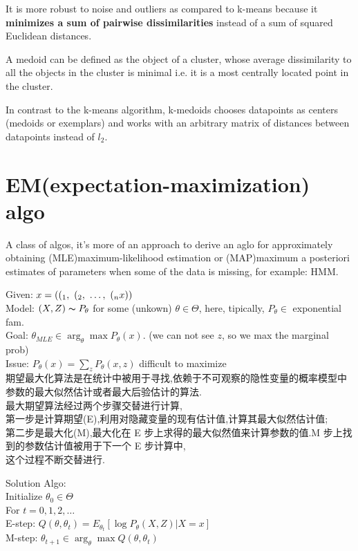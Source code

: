 \documentclass{article}
\begin{document}
It is more robust to noise and outliers as compared to k-means because it \textbf{minimizes a sum of pairwise dissimilarities} 
instead of a sum of squared Euclidean distances.

A medoid can be defined as the object of a cluster, whose average dissimilarity to all the objects in the cluster is minimal i.e. 
it is a most centrally located point in the cluster.

In contrast to the k-means algorithm, k-medoids chooses datapoints as centers (medoids or exemplars) and 
works with an arbitrary matrix of distances between datapoints instead of $l_2$.

\section{EM(expectation-maximization) algo}
A class of algos,
it's more of an approach to derive an aglo for approximately obtaining (MLE)maximum-likelihood estimation or 
(MAP)maximum a posteriori estimates of parameters when some of the data is missing, for example: HMM.

\noindent
Given: $x = ((_1,~(_2,~\ldots,~(_nx))$\\
Model: $(X, Z) \thicksim{P}_\theta$ for some (unkown) $\theta \in \Theta$, here, tipically, $P_\theta \in $ exponential fam.\\
Goal: $\theta_{MLE} \in \arg_\theta \max P_\theta(x)$. (we can not see $z$, so we max the marginal prob)\\
Issue: $P_\theta(x) = \sum_z P_\theta(x,z)$ difficult to maximize\\

期望最大化算法是在统计中被用于寻找,依赖于不可观察的隐性变量的概率模型中参数的最大似然估计或者最大后验估计的算法.\\
最大期望算法经过两个步骤交替进行计算,\\
第一步是计算期望(E),利用对隐藏变量的现有估计值,计算其最大似然估计值;\\
第二步是最大化(M),最大化在 E 步上求得的最大似然值来计算参数的值.M 步上找到的参数估计值被用于下一个 E 步计算中,\\
这个过程不断交替进行.

Solution Algo: \\
Initialize $\theta_0 \in \Theta$\\
For $t = 0,1,2, \ldots$\\
\quad E-step: $Q(\theta, \theta_t) = E_{\theta_t}[\log P_\theta(X,Z)|X = x]$ \\
\quad M-step: $\theta_{t+1} \in \arg_\theta \max Q(\theta, \theta_t)$
\end{document}
